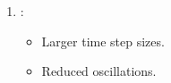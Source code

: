\documentclass{settings/laserbeam}
\begin{document}
\begin{frame}
{\begin{cbox}
\begin{enumerate}
            \begin{itemize}
                \item Smaller time step sizes.
                \item Increased oscillatory behavior
            \end{itemize}
            \item {}:
            \begin{itemize}
                \item Larger time step sizes.
                \item Reduced oscillations.
            \end{itemize}
        \end{enumerate}
    \end{cbox}}

\end{frame}
\end{document}
